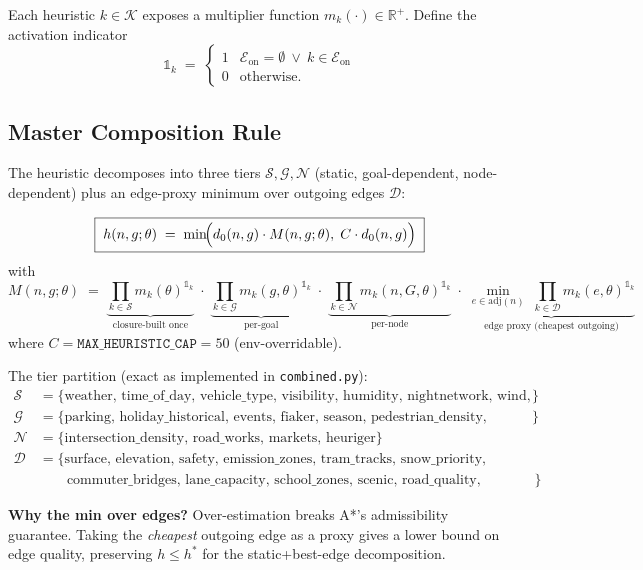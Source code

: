 \documentclass[12pt,a4paper]{article}
\begin{document}
Each heuristic $k \in \mathcal{K}$ exposes a multiplier function $m_k(\cdot) \in \mathbb{R}^+$. Define the activation indicator
\[
\mathbb{1}_k \;=\;
\begin{cases}
  1 & \mathcal{E}_{\text{on}} = \emptyset \ \lor\ k \in \mathcal{E}_{\text{on}} \\
  0 & \text{otherwise.}
\end{cases}
\]

\subsection{Master Composition Rule}

The heuristic decomposes into three tiers $\mathcal{S}, \mathcal{G}, \mathcal{N}$ (static, goal-dependent, node-dependent) plus an edge-proxy minimum over outgoing edges $\mathcal{D}$:

\[
\boxed{
\;
h(n,g;\theta) \;=\; \min\!\Bigl( d_0(n,g)\cdot M(n,g;\theta),\; C\cdot d_0(n,g)\Bigr)
\;}
\]
with
\[
M(n,g;\theta) \;=\; \underbrace{\prod_{k\in\mathcal{S}} m_k(\theta)^{\mathbb{1}_k}}_{\text{closure-built once}}
\;\cdot\;
\underbrace{\prod_{k\in\mathcal{G}} m_k(g,\theta)^{\mathbb{1}_k}}_{\text{per-goal}}
\;\cdot\;
\underbrace{\prod_{k\in\mathcal{N}} m_k(n,G,\theta)^{\mathbb{1}_k}}_{\text{per-node}}
\;\cdot\;
\underbrace{\min_{e\in\mathrm{adj}(n)}\;\prod_{k\in\mathcal{D}} m_k(e,\theta)^{\mathbb{1}_k}}_{\text{edge proxy (cheapest outgoing)}}
\]
where $C = \texttt{MAX\_HEURISTIC\_CAP} = 50$ (env-overridable).

The tier partition (exact as implemented in \texttt{combined.py}):
\begin{align*}
  \mathcal{S} &= \{\text{weather, time\_of\_day, vehicle\_type, visibility, humidity, nightnetwork, wind, headway}\} \\
  \mathcal{G} &= \{\text{parking, holiday\_historical, events, fiaker, season, pedestrian\_density, delivery}\} \\
  \mathcal{N} &= \{\text{intersection\_density, road\_works, markets, heuriger}\} \\
  \mathcal{D} &= \{\text{surface, elevation, safety, emission\_zones, tram\_tracks, snow\_priority,} \\
              &\qquad \text{commuter\_bridges, lane\_capacity, school\_zones, scenic, road\_quality, manual\_adjustment}\}
\end{align*}

\textbf{Why the min over edges?}\; Over-estimation breaks A*'s admissibility guarantee. Taking the \emph{cheapest} outgoing edge as a proxy gives a lower bound on edge quality, preserving $h \le h^*$ for the static+best-edge decomposition.
\end{document}
